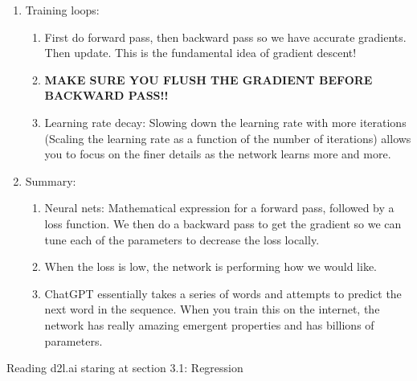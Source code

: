 \documentclass[a4paper, 11pt, oneside]{researchjournal} %
\begin{document}
\begin{enumerate}
\begin{enumerate}
    \end{enumerate}
    \item Training loops:
    \begin{enumerate}
        \item First do forward pass, then backward pass so we have accurate gradients. Then update. This is the fundamental idea of gradient descent!
        \item \textbf{MAKE SURE YOU FLUSH THE GRADIENT BEFORE BACKWARD PASS!!}
        \item Learning rate decay: Slowing down the learning rate with more iterations (Scaling the learning rate as a function of the number of iterations) allows you to focus on the finer details as the network learns more and more.  
    \end{enumerate}
    \item Summary: 
    \begin{enumerate}
        \item Neural nets: Mathematical expression for a forward pass, followed by a loss function. We then do a backward pass to get the gradient so we can tune each of the parameters to decrease the loss locally. 
        \item When the loss is low, the network is performing how we would like. 
        \item ChatGPT essentially takes a series of words and attempts to predict the next word in the sequence. When you train this on the internet, the network has really amazing emergent properties and has billions of parameters. 
    \end{enumerate}
\end{enumerate}

Reading d2l.ai staring at section 3.1: Regression
\end{document}
